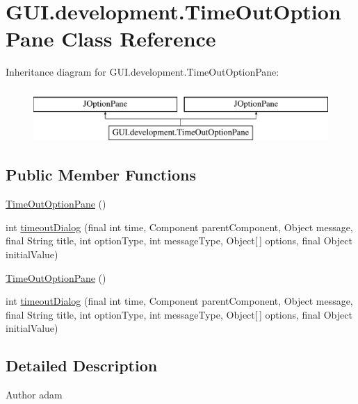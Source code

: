 \hypertarget{classGUI_1_1development_1_1TimeOutOptionPane}{\section{G\-U\-I.\-development.\-Time\-Out\-Option\-Pane Class Reference}
\label{classGUI_1_1development_1_1TimeOutOptionPane}
}
Inheritance diagram for G\-U\-I.\-development.\-Time\-Out\-Option\-Pane\-:\begin{figure}[H]
\begin{center}
\leavevmode
\includegraphics[height=2.000000cm]{classGUI_1_1development_1_1TimeOutOptionPane}
\end{center}
\end{figure}
\subsection*{Public Member Functions}
\begin{DoxyCompactItemize}
\item 
\hyperlink{classGUI_1_1development_1_1TimeOutOptionPane_accd0bbe0a3a759e4f0b31c2a61ece537}{Time\-Out\-Option\-Pane} ()
\item 
int \hyperlink{classGUI_1_1development_1_1TimeOutOptionPane_a76d2a6139406a26514ce249b41e4e748}{timeout\-Dialog} (final int time, Component parent\-Component, Object message, final String title, int option\-Type, int message\-Type, Object\mbox{[}$\,$\mbox{]} options, final Object initial\-Value)
\item 
\hyperlink{classGUI_1_1development_1_1TimeOutOptionPane_accd0bbe0a3a759e4f0b31c2a61ece537}{Time\-Out\-Option\-Pane} ()
\item 
int \hyperlink{classGUI_1_1development_1_1TimeOutOptionPane_a76d2a6139406a26514ce249b41e4e748}{timeout\-Dialog} (final int time, Component parent\-Component, Object message, final String title, int option\-Type, int message\-Type, Object\mbox{[}$\,$\mbox{]} options, final Object initial\-Value)
\end{DoxyCompactItemize}


\subsection{Detailed Description}
\begin{DoxyAuthor}{Author}
adam 
\end{DoxyAuthor}


